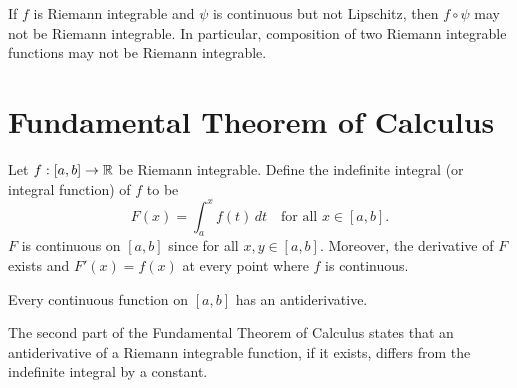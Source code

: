\begin{rmk}
    If $f$ is Riemann integrable and $\psi$ is continuous but not Lipschitz, then $f \circ \psi$ may not be Riemann integrable. In particular, composition of two Riemann integrable functions may not be Riemann integrable. 
\end{rmk}

\section{Fundamental Theorem of Calculus}

Let $f: [a, b] \to {\mathbb R}$ be Riemann integrable. Define the indefinite integral (or integral function) of $f$ to be
\[
F(x) = \int_a^x f(t) \, dt \quad \text{for all } x \in [a, b].
\]
$F$ is continuous on $[a, b]$ since for all $x, y \in [a, b]$. Moreover, the derivative of $F$ exists and $F'(x) = f(x)$ at every point where $f$ is continuous.

\begin{cl}
    Every continuous function on $[a, b]$ has an antiderivative.
\end{cl}

The second part of the Fundamental Theorem of Calculus states that an antiderivative of a Riemann integrable function, if it exists, differs from the indefinite integral by a constant.